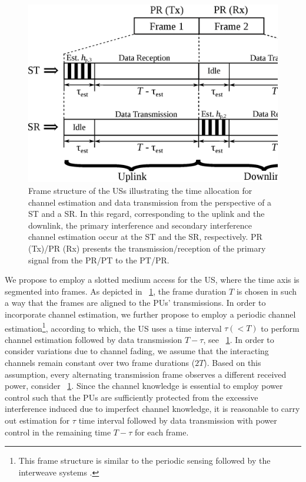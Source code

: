 \begin{figure}[!t]
\centering
\includegraphics[width = 0.6 \columnwidth]{figures/Frame_Structure}
\caption{Frame structure of the USs illustrating the time allocation for channel estimation and data transmission from the perspective of a ST and a SR. In this regard, corresponding to the uplink and the downlink, the primary interference and secondary interference channel estimation occur at the ST and the SR, respectively. PR (Tx)/PR (Rx) presents the transmission/reception of the primary signal from the PR/PT to the PT/PR.} 
\label{fig:fs}
\vspace{-7mm}
\end{figure}



We propose to employ a slotted medium access for the US, where the time axis is segmented into frames. As depicted in \figurename~\ref{fig:fs}, the frame duration $T$ is chosen in such a way that the frames are aligned to the PUs' transmissions. In order to incorporate channel estimation, we further propose to employ a periodic channel estimation\footnote{This frame structure is similar to the periodic sensing followed by the interweave systems \cite{Liang08}.}, according to which, the US uses a time interval $\tau (< T)$ to perform channel estimation followed by data transmission $T- \tau$, see \figurename~\ref{fig:fs}. In order to consider variations due to channel fading, we assume that the interacting channels remain constant over two frame durations ($2T$). Based on this assumption, every alternating transmission frame observes a different received power, consider \figurename~\ref{fig:fs}. Since the channel knowledge is essential to employ power control such that the PUs are sufficiently protected from the excessive interference induced due to imperfect channel knowledge, it is reasonable to carry out estimation for $\tau$ time interval followed by data transmission with power control in the remaining time $T - \tau$ for each frame. %

